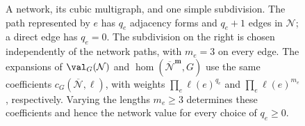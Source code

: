 \begin{figure}[tb]
\caption{A network, its cubic multigraph, and one simple subdivision.
The path represented by $e$ has $q_e$ adjacency forms and $q_e+1$ edges in $\mathcal N$;
a direct edge has $q_e=0$.
The subdivision on the right is chosen independently of the network paths,
with $m_e=3$ on every edge.
The expansions of $\val_G(\mathcal N)$ and $\hom(\overline{\mathcal N}^{\mathbf m},G)$
use the same coefficients $c_G(\overline{\mathcal N},\ell)$, with weights
$\prod_e\ell(e)^{q_e}$ and $\prod_e\ell(e)^{m_e}$, respectively.
Varying the lengths $m_e\geq3$ determines these coefficients and hence
the network value for every choice of $q_e\geq0$.}
\label{fig:network-subdivision}
\end{figure}
